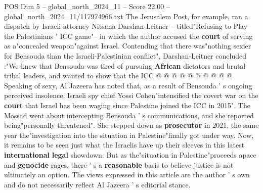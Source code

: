 \begin{textsample}{POS Dim 5 – global\_north\_2024\_11 – Score 22.00 – global\_north\_2024\_11/117974966.txt}
The Jerusalem Post, for example, ran a dispatch by Israeli attorney Nitsana Darshan-Leitner -- titled"Refusing to Play the Palestinians ' ICC game"-- in which the author accused the \textbf{court} of serving as a"concealed weapon"against Israel.
Contending that there was"nothing sexier for Bensouda than the Israeli-Palestinian conflict", Darshan-Leitner concluded :"We knew that Bensouda was tired of pursuing \textbf{African} dictators and brutal tribal leaders, and wanted to show that the ICC @ @ @ @ @ @ @ @ @ @ Speaking of sexy, Al Jazeera has noted that, as a result of Bensouda ' s ongoing perceived insolence, Israeli spy chief Yossi Cohen"intensified the covert war on the \textbf{court} that Israel has been waging since Palestine joined the ICC in 2015".
The Mossad went about intercepting Bensouda ' s communications, and she reported being"personally threatened".
She stepped down as \textbf{prosecutor} in 2021, the same year the"investigation into the situation in Palestine"finally got under way.
Now, it remains to be seen just what the Israelis have up their sleeves in this latest \textbf{international} \textbf{legal} showdown.
But as the"situation in Palestine"proceeds apace and \textbf{genocide} rages, there ' s a \textbf{reasonable} basis to believe justice is not ultimately an option.
The views expressed in this article are the author ' s own and do not necessarily reflect Al Jazeera ' s editorial stance.

\end{textsample}
